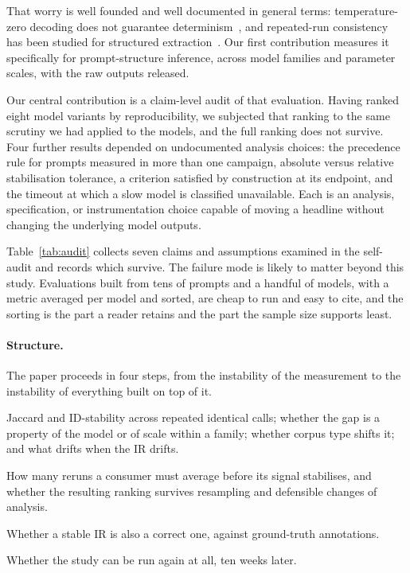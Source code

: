 \documentclass{article}
\begin{document}
That worry is well founded and well documented in general terms: temperature-zero decoding does not guarantee determinism~\citep{ouyang2025nondeterminism,atil2025nondeterminism}, and repeated-run consistency has been studied for structured extraction~\citep{yao2026consistency}. Our first contribution measures it specifically for prompt-structure inference, across model families and parameter scales, with the raw outputs released.

Our central contribution is a claim-level audit of that evaluation. Having ranked eight model variants by reproducibility, we subjected that ranking to the same scrutiny we had applied to the models, and the full ranking does not survive. Four further results depended on undocumented analysis choices: the precedence rule for prompts measured in more than one campaign, absolute versus relative stabilisation tolerance, a criterion satisfied by construction at its endpoint, and the timeout at which a slow model is classified unavailable. Each is an analysis, specification, or instrumentation choice capable of moving a headline without changing the underlying model outputs.

Table~\ref{tab:audit} collects seven claims and assumptions examined in the self-audit and records which survive. The failure mode is likely to matter beyond this study. Evaluations built from tens of prompts and a handful of models, with a metric averaged per model and sorted, are cheap to run and easy to cite, and the sorting is the part a reader retains and the part the sample size supports least.

\paragraph{Structure.}
The paper proceeds in four steps, from the instability of the measurement to the instability of everything built on top of it.

\begin{description}\itemsep1pt
  \item[\S\ref{sec:results}. Does the measurement reproduce?] Jaccard and ID-stability across repeated identical calls; whether the gap is a property of the model or of scale within a family; whether corpus type shifts it; and what drifts when the IR drifts.
  \item[\S\ref{sec:rq6}. Do the conclusions reproduce?] How many reruns a consumer must average before its signal stabilises, and whether the resulting ranking survives resampling and defensible changes of analysis.
  \item[\S\ref{sec:correctness}. Reproducibility is not validity.] Whether a stable IR is also a correct one, against ground-truth annotations.
  \item[\S\ref{sec:rq7}. Reproducibility over time.] Whether the study can be run again at all, ten weeks later.
\end{description}
\end{document}
